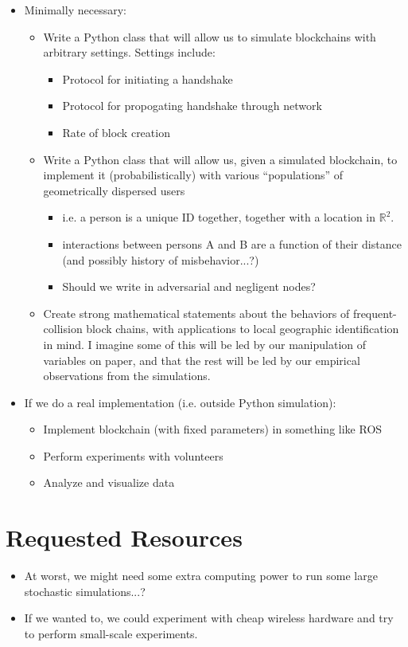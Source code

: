 \documentclass{article}
\begin{document}
\begin{itemize}
	\item Minimally necessary:
	\begin{itemize}
		\item Write a Python class that will allow us to simulate blockchains with arbitrary settings. Settings include:
		\begin{itemize}
			\item Protocol for initiating a handshake
			\item Protocol for propogating handshake through network
			\item Rate of block creation
		\end{itemize}
		\item Write a Python class that will allow us, given a simulated blockchain, to implement it (probabilistically) with various ``populations'' of geometrically dispersed users
		\begin{itemize}
			\item i.e. a person is a unique ID together, together with a location in $\mathbb{R}^2$.
			\item interactions between persons A and B are a function of their distance (and possibly history of misbehavior...?)
			\item Should we write in adversarial and negligent nodes?
		\end{itemize}
		\item Create strong mathematical statements about the behaviors of frequent-collision block chains, with applications to local geographic identification in mind. I imagine some of this will be led by our manipulation of variables on paper, and that the rest will be led by our empirical observations from the simulations.
	\end{itemize}
	\item If we do a real implementation (i.e. outside Python simulation):
	\begin{itemize}
		\item Implement blockchain (with fixed parameters) in something like ROS
		\item Perform experiments with volunteers
		\item Analyze and visualize data
	\end{itemize}
\end{itemize}

\section*{Requested Resources}
\begin{itemize}
	\item At worst, we might need some extra computing power to run some large stochastic simulations...?
	\item If we wanted to, we could experiment with cheap wireless hardware and try to perform small-scale experiments.
\end{itemize}
\end{document}
